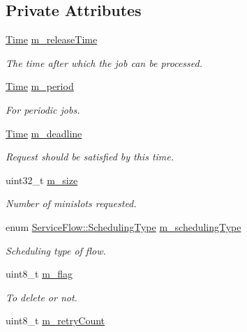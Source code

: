 \subsection*{Private Attributes}
\begin{DoxyCompactItemize}
\item 
\hyperlink{classns3_1_1Time}{Time} \hyperlink{classns3_1_1UlJob_a95de87b74e22b9fac4384c6c6ca27b6a}{m\+\_\+release\+Time}
\begin{DoxyCompactList}\small\item\em The time after which the job can be processed. \end{DoxyCompactList}\item 
\hyperlink{classns3_1_1Time}{Time} \hyperlink{classns3_1_1UlJob_ae4dd7227f82b38f532e4401509b2cb47}{m\+\_\+period}
\begin{DoxyCompactList}\small\item\em For periodic jobs. \end{DoxyCompactList}\item 
\hyperlink{classns3_1_1Time}{Time} \hyperlink{classns3_1_1UlJob_a8b8537377082a92f0280dad63011ab73}{m\+\_\+deadline}
\begin{DoxyCompactList}\small\item\em Request should be satisfied by this time. \end{DoxyCompactList}\item 
uint32\+\_\+t \hyperlink{classns3_1_1UlJob_a78d32b4939d1ecf587400c8e7537c984}{m\+\_\+size}
\begin{DoxyCompactList}\small\item\em Number of minislots requested. \end{DoxyCompactList}\item 
enum \hyperlink{classns3_1_1ServiceFlow_a7990ba10be1e098328fd1e6382a26235}{Service\+Flow\+::\+Scheduling\+Type} \hyperlink{classns3_1_1UlJob_ac6c4056f20e80313a84f032ba5bee253}{m\+\_\+scheduling\+Type}
\begin{DoxyCompactList}\small\item\em Scheduling type of flow. \end{DoxyCompactList}\item 
uint8\+\_\+t \hyperlink{classns3_1_1UlJob_a8c83246fd0f1ac301a9c961f505513ec}{m\+\_\+flag}
\begin{DoxyCompactList}\small\item\em To delete or not. \end{DoxyCompactList}\item 
uint8\+\_\+t \hyperlink{classns3_1_1UlJob_ac9c366964a6bb6620719e04a2b705ae0}{m\+\_\+retry\+Count}

\end{DoxyCompactItemize}
